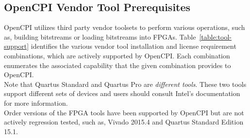 \begin{flushleft}
\begin{landscape}
\section{OpenCPI Vendor Tool Prerequisites}
\label{sec:doc_overview}
OpenCPI utilizes third party vendor toolsets to perform various operations, such as, building bitstreams or loading bitstreams into FPGAs.
Table~\ref{table:tool-support} identifies the various vendor tool installation and license requirement combinations, which are actively supported by OpenCPI. Each combination enumerates the associated capability that the given combination provides to OpenCPI. \\
Note that Quartus Standard and Quartus Pro are \textit{different tools}. These two tools support different sets of devices and users should consult Intel's documentation for more information.\\
Order versions of the FPGA tools have been supported by OpenCPI but are not actively regression tested, such as, Vivado 2015.4 and Quartus Standard Edition 15.1. \\


\end{landscape}
\end{flushleft}
